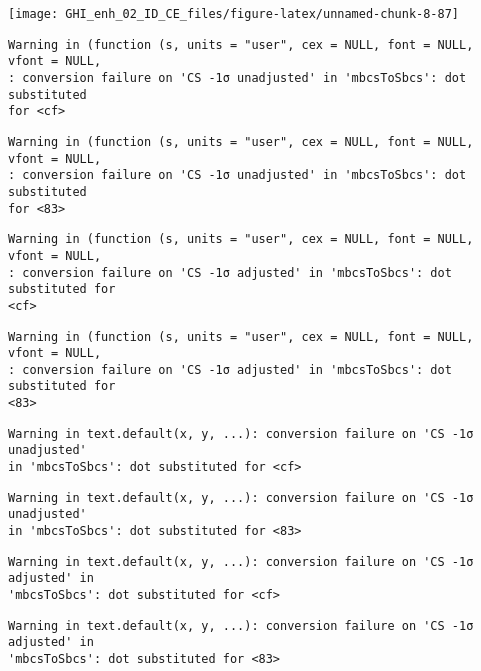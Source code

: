 \documentclass[
  10pt,
  a4paper,oneside]{article}
\begin{document}
\begin{center}\texttt{[image: GHI\_enh\_02\_ID\_CE\_files/figure-latex/unnamed-chunk-8-87]} \end{center}

\begin{verbatim}
Warning in (function (s, units = "user", cex = NULL, font = NULL, vfont = NULL,
: conversion failure on 'CS -1σ unadjusted' in 'mbcsToSbcs': dot substituted
for <cf>
\end{verbatim}

\begin{verbatim}
Warning in (function (s, units = "user", cex = NULL, font = NULL, vfont = NULL,
: conversion failure on 'CS -1σ unadjusted' in 'mbcsToSbcs': dot substituted
for <83>
\end{verbatim}

\begin{verbatim}
Warning in (function (s, units = "user", cex = NULL, font = NULL, vfont = NULL,
: conversion failure on 'CS -1σ adjusted' in 'mbcsToSbcs': dot substituted for
<cf>
\end{verbatim}

\begin{verbatim}
Warning in (function (s, units = "user", cex = NULL, font = NULL, vfont = NULL,
: conversion failure on 'CS -1σ adjusted' in 'mbcsToSbcs': dot substituted for
<83>
\end{verbatim}

\begin{verbatim}
Warning in text.default(x, y, ...): conversion failure on 'CS -1σ unadjusted'
in 'mbcsToSbcs': dot substituted for <cf>
\end{verbatim}

\begin{verbatim}
Warning in text.default(x, y, ...): conversion failure on 'CS -1σ unadjusted'
in 'mbcsToSbcs': dot substituted for <83>
\end{verbatim}

\begin{verbatim}
Warning in text.default(x, y, ...): conversion failure on 'CS -1σ adjusted' in
'mbcsToSbcs': dot substituted for <cf>
\end{verbatim}

\begin{verbatim}
Warning in text.default(x, y, ...): conversion failure on 'CS -1σ adjusted' in
'mbcsToSbcs': dot substituted for <83>
\end{verbatim}
\end{document}
